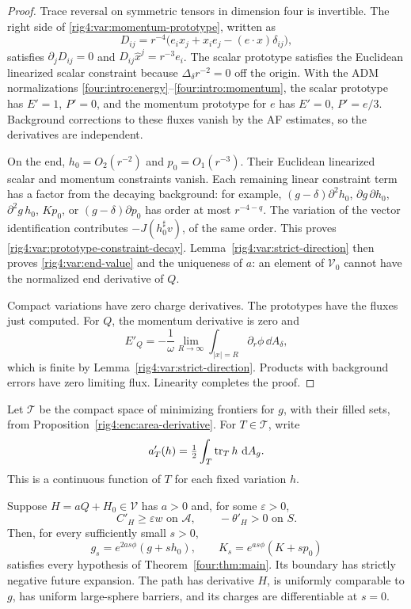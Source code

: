 \begin{proof}
Trace reversal on symmetric tensors in dimension four is invertible. The
right side of \eqref{rig4:var:momentum-prototype}, written as
\[
 D_{ij}=r^{-4}\bigl(e_i x_j+x_i e_j-(e\cdot x)\delta_{ij}\bigr),
\]
satisfies $\partial_jD_{ij}=0$ and $D_{ij}\widehat x^j=r^{-3}e_i$.
The scalar prototype satisfies the Euclidean linearized scalar constraint
because $\Delta_\delta r^{-2}=0$ off the origin. With the ADM normalizations
\eqref{four:intro:energy}--\eqref{four:intro:momentum}, the scalar prototype
has $E'=1$, $P'=0$, and the momentum
prototype for $e$ has $E'=0$, $P'=e/3$. Background corrections to these
fluxes vanish by the AF estimates, so the derivatives are independent.

On the end, $h_0=O_2(r^{-2})$ and $p_0=O_1(r^{-3})$. Their Euclidean
linearized scalar and momentum constraints vanish. Each remaining linear
constraint term has a factor from the decaying background: for example,
$(g-\delta)\partial^2h_0$, $\partial g\,\partial h_0$,
$\partial^2g\,h_0$, $Kp_0$, or $(g-\delta)\partial p_0$ has order at most
$r^{-4-q}$. The variation of the vector identification contributes
$-J(h_0^\sharp v)$, of the same order. This proves
\eqref{rig4:var:prototype-constraint-decay}. Lemma~\ref{rig4:var:strict-direction}
then proves \eqref{rig4:var:end-value} and the uniqueness of $a$: an element of
$\mathcal V_0$ cannot have the normalized end derivative of $Q$.

Compact variations have zero charge derivatives. The prototypes have the
fluxes just computed. For $Q$, the momentum derivative is zero and
\[
 E'_Q=-\frac1\omega\lim_{R\to\infty}
              \int_{|x|=R}\partial_r\phi\,\dd A_\delta,
\]
which is finite by Lemma~\ref{rig4:var:strict-direction}. Products with
background errors have zero limiting flux. Linearity completes the proof.
\end{proof}

Let $\mathcal T$ be the compact space of minimizing frontiers for $g$,
with their filled sets, from Proposition~\ref{rig4:enc:area-derivative}.
For $T\in\mathcal T$, write
\begin{equation}
 a'_T(h)=\tfrac12\int_T\operatorname{tr}_T h\,\,\mathrm d A_g.
\label{rig4:var:fixed-area-derivative}
\end{equation}
This is a continuous function of $T$ for each fixed variation $h$.

\begin{lemma}
\label{rig4:var:feasible-path}
Suppose $H=aQ+H_0\in\mathcal V$ has $a>0$ and, for some $\varepsilon>0$,
\[
 C'_H\ge\varepsilon w\text{ on }\mathcal A,\qquad
 -\theta'_H>0\text{ on }S.
\]
Then, for every sufficiently small $s>0$,
\begin{equation}
 g_s=e^{2as\phi}(g+sh_0),\qquad
 K_s=e^{as\phi}(K+sp_0)
\label{rig4:var:nonlinear-path}
\end{equation}
satisfies every hypothesis of Theorem~\ref{four:thm:main}. Its boundary
has strictly negative future expansion. The path has derivative $H$, is
uniformly comparable to $g$, has uniform large-sphere barriers, and its
charges are differentiable at $s=0$.
\end{lemma}

